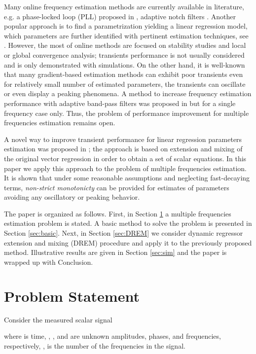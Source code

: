 \documentclass[journal, onecolumn]{IEEEtran}
\begin{document}
Many online frequency estimation methods are currently available in literature, e.g. a phase-locked loop (PLL) proposed in \cite{wu2003magnitude}, adaptive notch filters \cite{regalia1991improved, mojiri2004adaptive}. Another popular approach is to find a parametrization yielding a linear regression model, which parameters are further identified with pertinent estimation techniques, see \cite{xia, chen2014robust, fedele2014frequency}. However, the most of online methods are focused on stability studies and local or global convergence analysis; transients performance is not usually considered and is only demonstrated with simulations. On the other hand, it is well-known that many gradient-based estimation methods can exhibit poor transients even for relatively small number of estimated parameters, the transients can oscillate or even display a peaking phenomena. A method to increase frequency estimation performance with adaptive band-pass filters was proposed in \cite{Aranovskiy2015Cascade} but for a single frequency case only. Thus, the problem of performance improvement for multiple frequencies estimation remains open.

A novel way to improve transient performance for linear regression parameters estimation was proposed in \cite{Aranovskiy2015DREM}; the approach is based on extension and mixing of the original vector regression in order to obtain a set of scalar equations. In this paper we apply this approach to the problem of multiple frequencies estimation. It is shown that under some reasonable assumptions and neglecting fast-decaying terms, \emph{non-strict monotonicty} can be provided for estimates of parameters avoiding any oscillatory or peaking behavior. 

The paper is organized as follows. First, in Section \ref{sec:PS} a multiple frequencies estimation problem is stated. A basic method to solve the problem is presented in Section \ref{sec:basic}. Next, in Section \ref{sec:DREM} we consider dynamic regressor extension and mixing (DREM) procedure and apply it to the previously proposed method. Illustrative results are given in Section \ref{sec:sim} and the paper is wrapped up with Conclusion.

\section{Problem Statement} \label{sec:PS}
Consider the measured scalar signal 

where  is time, , , and  are unknown amplitudes, phases, and frequencies, respectively, ,  is the number of the frequencies in the signal. 
\end{document}
